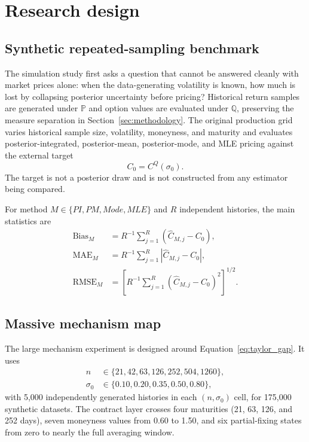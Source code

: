 \section{Research design}\label{sec:design}

\subsection{Synthetic repeated-sampling benchmark}

The simulation study first asks a question that cannot be answered cleanly with market prices alone: when the data-generating volatility is known, how much is lost by collapsing posterior uncertainty before pricing? Historical return samples are generated under $\mathbb P$ and option values are evaluated under $\mathbb Q$, preserving the measure separation in Section~\ref{sec:methodology}. The original production grid varies historical sample size, volatility, moneyness, and maturity and evaluates posterior-integrated, posterior-mean, posterior-mode, and MLE pricing against the external target
\begin{equation}
 C_0=C^Q(\sigma_0).
 \label{eq:synthetic_target}
\end{equation}
The target is not a posterior draw and is not constructed from any estimator being compared.

For method $M\in\{PI,PM,Mode,MLE\}$ and $R$ independent histories, the main statistics are
\begin{align}
 \operatorname{Bias}_M
 &=R^{-1}\sum_{j=1}^{R}(\widehat C_{M,j}-C_0),\\
 \operatorname{MAE}_M
 &=R^{-1}\sum_{j=1}^{R}|\widehat C_{M,j}-C_0|,\\
 \operatorname{RMSE}_M
 &=\left[R^{-1}\sum_{j=1}^{R}(\widehat C_{M,j}-C_0)^2\right]^{1/2}.
 \label{eq:metrics}
\end{align}

\subsection{Massive mechanism map}

The large mechanism experiment is designed around Equation~\eqref{eq:taylor_gap}. It uses
\begin{align}
 n&\in\{21,42,63,126,252,504,1260\},\\
 \sigma_0&\in\{0.10,0.20,0.35,0.50,0.80\},
\end{align}
with 5,000 independently generated histories in each $(n,\sigma_0)$ cell, for 175,000 synthetic datasets. The contract layer crosses four maturities (21, 63, 126, and 252 days), seven moneyness values from 0.60 to 1.50, and six partial-fixing states from zero to nearly the full averaging window.

